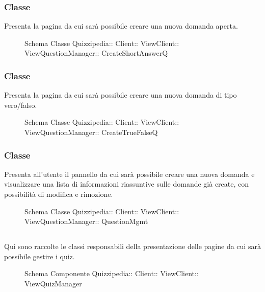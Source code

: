 \subsubsection{Classe }
Presenta la pagina da cui sarà possibile creare una nuova domanda aperta.
\begin{figure}[H]
\centering
\noindent{}
\caption[Schema Classe CreateShortAnswerQ]{Schema Classe Quizzipedia:: Client:: ViewClient:: ViewQuestionManager:: CreateShortAnswerQ}
\end{figure}
\subsubsection{Classe }
Presenta la pagina da cui sarà possibile creare una nuova domanda di tipo vero/falso.
\begin{figure}[H]
\centering
\noindent{}
\caption[Schema Classe CreateTrueFalseQ]{Schema Classe Quizzipedia:: Client:: ViewClient:: ViewQuestionManager:: CreateTrueFalseQ}
\end{figure}
\subsubsection{Classe }
Presenta all'utente il pannello da cui sarà possibile creare una nuova domanda e visualizzare una lista di informazioni riassuntive sulle domande già create, con possibilità di modifica e rimozione.
\begin{figure}[H]
\centering
\noindent{}
\caption[Schema Classe QuestionMgmt]{Schema Classe Quizzipedia:: Client:: ViewClient:: ViewQuestionManager:: QuestionMgmt}
\end{figure}
\subsection{}
Qui sono raccolte le classi responsabili della presentazione delle pagine da cui sarà possibile gestire i quiz.
\begin{figure}[H]
\centering
\noindent{}
\caption[Schema Componente Quizzipedia::Client::ViewClient::ViewQuizManager]{Schema Componente Quizzipedia:: Client:: ViewClient:: ViewQuizManager}
\end{figure}

